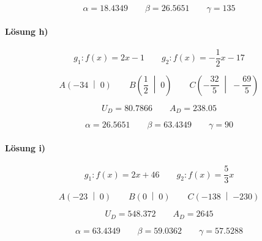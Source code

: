 \begin{equation*}
  \alpha=\num{18.4349}
  \qquad
  \beta=\num{26.5651}
  \qquad
  \gamma=\num{135}
\end{equation*}

\paragraph{Lösung h)}
\begin{equation*}
  g_1:f(x)=\num{2}x-\num{1}
  \qquad
  g_2:f(x)=-\frac{\num{1}}{\num{2}}x-\num{17}
\end{equation*}

\begin{equation*}
  A\left(\num{-34}\;\middle|\;\num{0}\right)
  \qquad
  B\left(\frac{\num{1}}{\num{2}}\;\middle|\;\num{0}\right)
  \qquad
  C\left(-\frac{\num{32}}{\num{5}}\;\middle|\;-\frac{\num{69}}{\num{5}}\right)
\end{equation*}

\begin{equation*}
  U_D=\num{80.7866}
  \qquad
  A_D=\num{238.05}
\end{equation*}

\begin{equation*}
  \alpha=\num{26.5651}
  \qquad
  \beta=\num{63.4349}
  \qquad
  \gamma=\num{90}
\end{equation*}

\paragraph{Lösung i)}
\begin{equation*}
  g_1:f(x)=\num{2}x+\num{46}
  \qquad
  g_2:f(x)=\frac{\num{5}}{\num{3}}x
\end{equation*}

\begin{equation*}
  A\left(\num{-23}\;\middle|\;\num{0}\right)
  \qquad
  B\left(\num{0}\;\middle|\;\num{0}\right)
  \qquad
  C\left(\num{-138}\;\middle|\;\num{-230}\right)
\end{equation*}

\begin{equation*}
  U_D=\num{548.372}
  \qquad
  A_D=\num{2645}
\end{equation*}

\begin{equation*}
  \alpha=\num{63.4349}
  \qquad
  \beta=\num{59.0362}
  \qquad
  \gamma=\num{57.5288}
\end{equation*}

